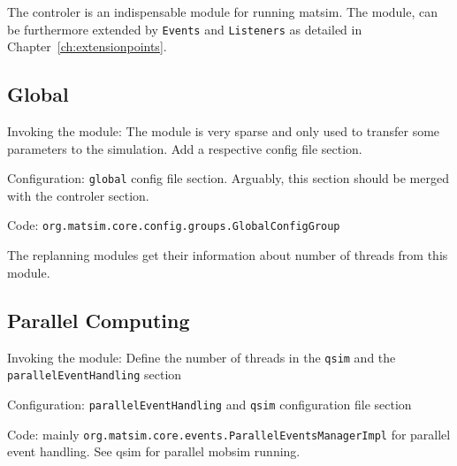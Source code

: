 The controler is an indispensable module for running \gls{matsim}. The module, can be furthermore extended by \lstinline|Events| and \lstinline|Listeners| as detailed in Chapter~\ref{ch:extensionpoints}. 
%


\subsection{Global}
\label{sec:global}
\begin{compactitem}
\item Invoking the module: The module is very sparse and only used to transfer some parameters to the simulation. Add a respective config file section.
\item Configuration: \lstinline|global| config file section. Arguably, this section should be merged with the controler section.
\item Code: \lstinline|org.matsim.core.config.groups.GlobalConfigGroup|
\end{compactitem}

The replanning modules get their information about number of threads from this module. 


\subsection{Parallel Computing}
\label{sec:parallelcomputing}
\begin{compactitem}
\item Invoking the module: Define the number of threads in the \lstinline|qsim| and the \lstinline|parallelEventHandling| section
\item Configuration: \lstinline|parallelEventHandling| and \lstinline|qsim| configuration file section
\item Code: mainly \lstinline|org.matsim.core.events.ParallelEventsManagerImpl| for parallel event handling. See qsim for parallel mobsim running.
\end{compactitem}

